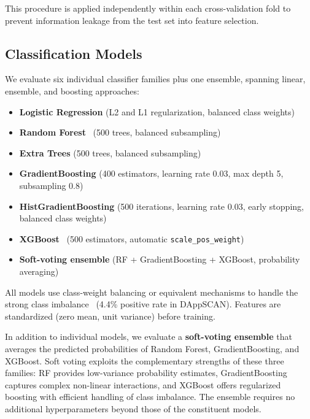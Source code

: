 \documentclass[11pt,a4paper]{article}
\begin{document}
This procedure is applied independently within each cross-validation fold to prevent information leakage from the test set into feature selection.

\subsection{Classification Models}
\label{sec:models}

We evaluate six individual classifier families plus one ensemble, spanning linear, ensemble, and boosting approaches:

\begin{itemize}
    \item \textbf{Logistic Regression} (L2 and L1 regularization, balanced class weights)
    \item \textbf{Random Forest}~\cite{breiman2001random} (500 trees, balanced subsampling)
    \item \textbf{Extra Trees} (500 trees, balanced subsampling)
    \item \textbf{GradientBoosting} (400 estimators, learning rate 0.03, max depth 5, subsampling 0.8)
    \item \textbf{HistGradientBoosting} (500 iterations, learning rate 0.03, early stopping, balanced class weights)
    \item \textbf{XGBoost}~\cite{chen2016xgboost} (500 estimators, automatic \texttt{scale\_pos\_weight})
    \item \textbf{Soft-voting ensemble} (RF + GradientBoosting + XGBoost, probability averaging)
\end{itemize}

All models use class-weight balancing or equivalent mechanisms to handle the strong class imbalance~\cite{he2009learning} (4.4\% positive rate in DAppSCAN).
Features are standardized (zero mean, unit variance) before training.

In addition to individual models, we evaluate a \textbf{soft-voting ensemble} that averages the predicted probabilities of Random Forest, GradientBoosting, and XGBoost.
Soft voting exploits the complementary strengths of these three families: RF provides low-variance probability estimates, GradientBoosting captures complex non-linear interactions, and XGBoost offers regularized boosting with efficient handling of class imbalance.
The ensemble requires no additional hyperparameters beyond those of the constituent models.
\end{document}
